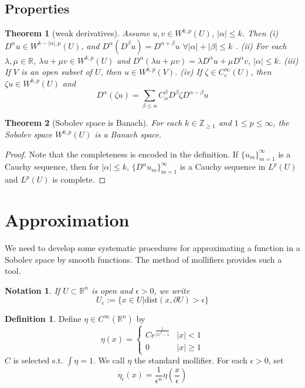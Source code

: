 \documentclass{article}
\newtheorem{theorem}{Theorem}[section]
\newtheorem{notation}{Notation}
\theoremstyle{definition}
\newtheorem{definition}{Definition}[section]
\begin{document}
\subsection{Properties}
\begin{theorem}[weak derivatives]
    Assume $u,v\in W^{k,p}(U)$, $|\alpha|\le k$. Then \newline 
    (i) $D^\alpha u\in W^{k-|\alpha|,p}(U)$, and $D^\alpha(D^\beta u) =D^{\alpha+\beta}u$ $\forall |\alpha|+|\beta|\le k$ .\newline 
    (ii) For each $\lambda,\mu\in\mathbb{R}$, $\lambda u+\mu v\in W^{k,p}(U)$ and $D^\alpha(\lambda u+\mu v)=\lambda D^\alpha u+\mu D^\alpha v$, $|\alpha|\le k$.\newline 
    (iii) If $V$ is an open subset of $U$, then $u\in W^{k,p}(V)$.\newline 
    (iv) If $\zeta\in C^\infty_c(U)$, then $\zeta u\in W^{k,p}(U)$ and 
    \[ D^\alpha(\zeta u)=\sum_{\beta\le \alpha}C_\alpha^\beta D^\beta\zeta D^{\alpha-\beta}u \]
\end{theorem}

\begin{theorem}[Sobolev space is Banach]
    For each $k\in\mathbb{Z}_{\ge 1}$ and $1\le p\le\infty$, the Sobolev space $W^{k,p}(U)$ is a Banach space.
\end{theorem}
\begin{proof}
    Note that the completeness is encoded in the definition. If $\{u_m\}_{m=1}^\infty$ is a Cauchy sequence, then for $|\alpha|\le k$, $\{D^\alpha u_m\}_{m=1}^\infty$
    is a Cauchy sequence in $L^p(U)$ and $L^p(U)$ is complete.
\end{proof}

\section{Approximation}
We need to develop some systematic procedures for approximating a function in a Sobolev space by smooth functions. 
The method of mollifiers provides such a tool.
\begin{notation}
    If $U\subset \mathbb{R}^n$ is open and $\epsilon>0$, we write 
    \[ U_\epsilon:=\{x\in U|\text{dist}(x,\partial U)>\epsilon\} \]
\end{notation}

\begin{definition}
    Define $\eta\in C^\infty(\mathbb{R}^n)$ by \[\eta (x)=\left\{\begin{matrix}
        Ce^{\frac{1}{|x|^2-1}} & |x|<1\\
        0 & |x|\ge 1
       \end{matrix}\right.\] 
       $C$ is selected s.t. $\int \eta =1$. We call $\eta$ the standard mollifier.\newline 
       For each $\epsilon>0$, set \[\eta_\epsilon(x)=\frac{1}{\epsilon^n}\eta(\frac{x}{\epsilon})\]
\end{definition}
\end{document}
